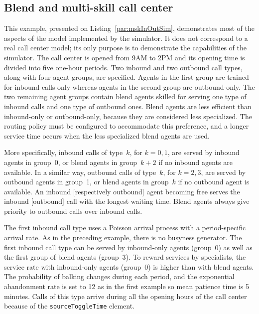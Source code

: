 \subsection{Blend and multi-skill call center}
\label{sec:mskInOutSim}

This example, presented on Listing~\ref{par:mskInOutSim},
demonstrates most of the aspects of the model implemented
by the simulator.
It does not correspond to a real call center model;
its only purpose is to demonstrate the capabilities of the simulator.
The call center is opened from 9AM to 2PM and its opening time is
divided into five one-hour periods.
Two inbound and two outbound call types, along with four agent groups,
are specified.  Agents in the first group are trained for inbound calls
only whereas agents in the second group are outbound-only.  The two
remaining agent groups contain blend agents skilled for serving one
type of inbound calls and one type of outbound ones.
Blend agents are less efficient than inbound-only or outbound-only,
because they are considered less specialized.
The routing policy must be configured to accommodate this preference, and
a longer service time occurs when the less specialized blend agents are
used.

More specifically,
inbound calls of type~$k$, for $k=0,1$, are served by inbound
agents in group~0, or blend agents in group~$k+2$ if no inbound agents
are available.
In a similar way, outbound calls of type~$k$, for $k=2,3$, are served
by outbound agents in group~1, or blend agents in group~$k$
if no outbound agent is available.
An inbound [respectively outbound] agent becoming free serves the
inbound [outbound] call with the longest waiting time.
Blend agents always give priority to outbound calls over inbound
calls.



The first inbound call type uses a Poisson arrival
process with a period-specific arrival rate.  As in the
preceding example, there is no busyness generator.
The first inbound call type can be served by inbound-only agents
(group~0) as well as the first group of blend agents (group~3).
To reward services by specialists, the service rate with inbound-only
agents (group~0) is higher than with blend agents.
The probability of balking changes during each period, and
the exponential abandonment rate is set to 12 as in the first example
so mean patience time is 5 minutes.
Calls of this type arrive during all the opening hours of the call
center because of the \texttt{source\-Toggle\-Time} element.

